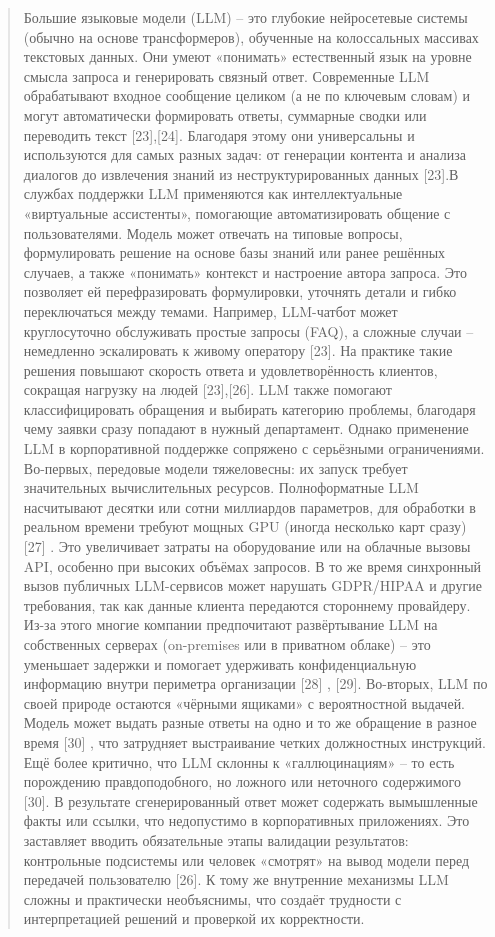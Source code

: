 \begin{quote}
Большие языковые модели (LLM) -- это глубокие нейросетевые системы
(обычно на основе трансформеров), обученные на колоссальных массивах
текстовых данных. Они умеют «понимать» естественный язык на уровне
смысла запроса и генерировать связный ответ. Современные LLM
обрабатывают входное сообщение целиком (а не по ключевым словам) и могут
автоматически формировать ответы, суммарные сводки или переводить текст
{[}23{]},{[}24{]}. Благодаря этому они универсальны и используются для
самых разных задач: от генерации контента и анализа диалогов до
извлечения знаний из неструктурированных данных {[}23{]}.В службах
поддержки LLM применяются как интеллектуальные «виртуальные ассистенты»,
помогающие автоматизировать общение с пользователями. Модель может
отвечать на типовые вопросы, формулировать решение на основе базы знаний
или ранее решённых случаев, а также «понимать» контекст и настроение
автора запроса. Это позволяет ей перефразировать формулировки, уточнять
детали и гибко переключаться между темами. Например, LLM-чатбот может
круглосуточно обслуживать простые запросы (FAQ), а сложные случаи --
немедленно эскалировать к живому оператору {[}23{]}. На практике такие
решения повышают скорость ответа и удовлетворённость клиентов, сокращая
нагрузку на людей {[}23{]},{[}26{]}. LLM также помогают классифицировать
обращения и выбирать категорию проблемы, благодаря чему заявки сразу
попадают в нужный департамент. Однако применение LLM в корпоративной
поддержке сопряжено с серьёзными ограничениями. Во-первых, передовые
модели тяжеловесны: их запуск требует значительных вычислительных
ресурсов. Полноформатные LLM насчитывают десятки или сотни миллиардов
параметров, для обработки в реальном времени требуют мощных GPU (иногда
несколько карт сразу) {[}27{]} . Это увеличивает затраты на оборудование
или на облачные вызовы API, особенно при высоких объёмах запросов. В то
же время синхронный вызов публичных LLM-сервисов может нарушать
GDPR/HIPAA и другие требования, так как данные клиента передаются
стороннему провайдеру. Из-за этого многие компании предпочитают
развёртывание LLM на собственных серверах (on-premises или в приватном
облаке) -- это уменьшает задержки и помогает удерживать конфиденциальную
информацию внутри периметра организации {[}28{]} , {[}29{]}. Во-вторых,
LLM по своей природе остаются «чёрными ящиками» с вероятностной выдачей.
Модель может выдать разные ответы на одно и то же обращение в разное
время {[}30{]} , что затрудняет выстраивание четких должностных
инструкций. Ещё более критично, что LLM склонны к «галлюцинациям» -- то
есть порождению правдоподобного, но ложного или неточного содержимого
{[}30{]}. В результате сгенерированный ответ может содержать вымышленные
факты или ссылки, что недопустимо в корпоративных приложениях. Это
заставляет вводить обязательные этапы валидации результатов: контрольные
подсистемы или человек «смотрят» на вывод модели перед передачей
пользователю {[}26{]}. К тому же внутренние механизмы LLM сложны и
практически необъяснимы, что создаёт трудности с интерпретацией решений
и проверкой их корректности.


\end{quote}
